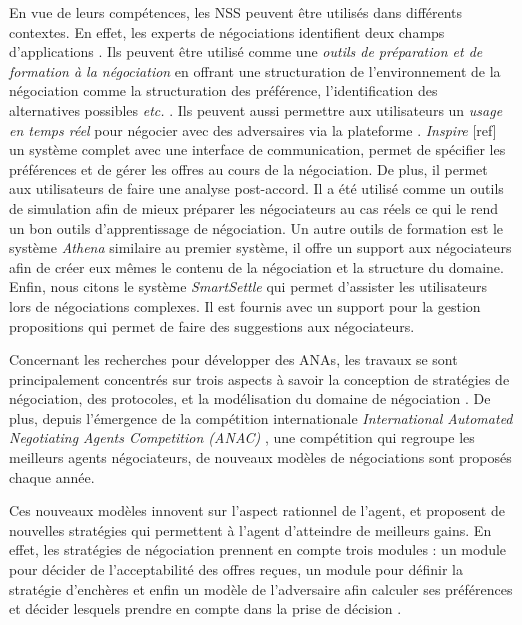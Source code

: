 	 En vue de leurs compétences, les NSS peuvent être utilisés dans différents contextes. En effet, les experts de négociations identifient deux champs d'applications \cite{pommeranz2009design}. Ils peuvent être utilisé comme une\textit{ outils de préparation et de formation à la négociation} en offrant une structuration de l'environnement de la négociation comme la structuration des préférence, l'identification  des alternatives possibles \emph{etc.} \cite{broekens2010affective}.  Ils peuvent aussi permettre aux utilisateurs un \textit{usage en temps réel} pour négocier avec des adversaires via la plateforme \cite{pommeranz2009design}. 
	 \emph{Inspire} [ref] un système complet avec une interface de communication, permet de spécifier les préférences et de gérer les offres au cours de la négociation. De plus, il permet aux utilisateurs de faire une analyse post-accord. 
	 Il a été utilisé comme  un outils de simulation afin de mieux préparer les négociateurs au cas réels ce qui le rend un bon outils d'apprentissage de négociation. Un autre outils de formation est le système \emph{Athena} similaire au premier système, il offre un support aux négociateurs afin de créer eux mêmes le contenu de la négociation et la structure du domaine. Enfin, nous citons le système \emph{SmartSettle} qui permet d'assister les utilisateurs lors de négociations complexes. Il est fournis avec un support pour la gestion propositions qui permet de faire des suggestions aux négociateurs. 
	  
	Concernant les recherches pour développer des ANAs, les travaux se sont principalement concentrés sur trois aspects à savoir la conception de stratégies de négociation, des protocoles, et la modélisation du domaine de négociation \cite{jonker2012negotiating}. De plus, depuis l'émergence de la compétition internationale \emph{International Automated Negotiating Agents Competition (ANAC)} \cite{reftoANAc}, une compétition qui regroupe les meilleurs agents négociateurs, de nouveaux modèles de négociations sont proposés chaque année. 
	
	Ces nouveaux modèles innovent sur l'aspect rationnel de l'agent, et proposent de nouvelles stratégies qui permettent à l'agent d'atteindre de meilleurs gains. 
	En effet, les stratégies de négociation prennent en compte trois modules : un module pour décider de l'acceptabilité des offres reçues, un module pour définir la stratégie d'enchères et enfin un modèle de l'adversaire afin calculer ses préférences et décider lesquels prendre en compte dans la prise de décision \cite{baarslag2014decoupling}.
	
